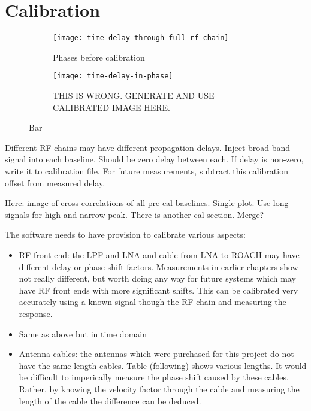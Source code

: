\section{Calibration}

\begin{figure}
  \centering
  \begin{subfigure}[b]{0.49\textwidth}
    \centering
    \texttt{[image: time-delay-through-full-rf-chain]}
    \caption{Phases before calibration}
  \end{subfigure}
  \begin{subfigure}[b]{0.49\textwidth}
    \centering
    \texttt{[image: time-delay-in-phase]}
    \caption{THIS IS WRONG. GENERATE AND USE CALIBRATED IMAGE HERE.}
  \end{subfigure}
  \caption{Bar}
\end{figure}
Different RF chains may have different propagation delays. 
Inject broad band signal into each baseline. Should be zero delay between each. 
If delay is non-zero, write it to calibration file.
For future measurements, subtract this calibration offset from measured delay. 

Here: image of cross correlations of all pre-cal baselines. Single plot. Use long signals for high and narrow peak.
There is another cal section. Merge?

The software needs to have provision to calibrate various aspects:
\begin{itemize}
  \item RF front end: the LPF and LNA and cable from LNA to ROACH may have different delay or phase shift factors. Measurements in earlier chapters show not really different, but worth doing any way for future systems which may have RF front ends with more significant shifts. This can be calibrated very accurately using a known signal though the RF chain and measuring the response.
  \item Same as above but in time domain
  \item Antenna cables: the antennas which were purchased for this project do not have the same length cables. Table (following) shows various lengths. It would be difficult to imperically measure the phase shift caused by these cables. Rather, by knowing the velocity factor through the cable and measuring the length of the cable the difference can be deduced.
\end{itemize}

